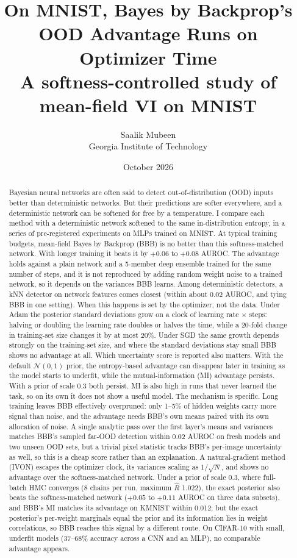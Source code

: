 \documentclass[11pt]{article}
\title{On MNIST, Bayes by Backprop's OOD Advantage Runs on Optimizer Time\\[4pt]
\large A softness-controlled study of mean-field VI on MNIST}
\author{Saalik Mubeen\\Georgia Institute of Technology}
\date{October 2026}
\begin{document}
\maketitle

\begin{abstract}
Bayesian neural networks are often said to detect out-of-distribution (OOD)
inputs better than deterministic networks. But their predictions are softer
everywhere, and a deterministic network can be softened for free by a
temperature. I compare each method with a deterministic network softened to
the same in-distribution entropy, in a series of pre-registered experiments
on MLPs trained on MNIST. At typical training budgets, mean-field Bayes by
Backprop (BBB) is no better than this softness-matched network. With longer
training it beats it by $+0.06$ to $+0.08$ AUROC. The advantage holds against
a plain network and a 5-member deep ensemble trained for the same number of
steps, and it is not reproduced by adding random weight noise to a trained
network, so it depends on the variances BBB learns. Among deterministic
detectors, a kNN detector on network features comes closest (within about
0.02 AUROC, and tying BBB in one setting). When this happens is set by
the optimizer, not the data. Under Adam the posterior standard deviations grow
on a clock of learning rate $\times$ steps: halving or doubling the learning rate
doubles or halves the time, while a 20-fold change in training-set size changes
it by at most 20\%. Under SGD the same growth depends strongly on the
training-set size, and where the standard deviations stay small BBB shows no
advantage at all. Which uncertainty score is reported also matters. With the
default $\mathcal N(0,1)$ prior, the entropy-based advantage can disappear later
in training as the model starts to underfit, while the mutual-information (MI)
advantage persists. With a prior of scale 0.3 both persist. MI is also high in
runs that never learned the task, so on its own it does not show a useful
model. The mechanism is specific. Long training leaves BBB effectively
overpruned: only 1--5\% of hidden weights carry more signal than noise, and the
advantage needs BBB's own means paired with its own allocation of noise.
A single analytic pass over the first layer's means and variances matches
BBB's sampled far-OOD detection within 0.02 AUROC on fresh models and two
unseen OOD sets, but a trivial pixel statistic tracks BBB's per-image
uncertainty as well, so this is a cheap score rather than an explanation. A natural-gradient method (IVON)
escapes the optimizer clock, its variances scaling as $1/\sqrt{N}$, and shows no
advantage over the softness-matched network. Under a prior of scale 0.3, where full-batch HMC
converges (8 chains per run, maximum $\hat R$ 1.022), the exact posterior also beats the
softness-matched network ($+0.05$ to $+0.11$ AUROC on three data subsets), and
BBB's MI matches its advantage on KMNIST within 0.012; but the exact posterior's per-weight
marginals equal the prior and its information lies in weight correlations, so
BBB reaches this signal by a different route. On CIFAR-10 with small, underfit models (37--68\% accuracy across a CNN and
an MLP), no comparable advantage appears.
\end{abstract}
\end{document}
